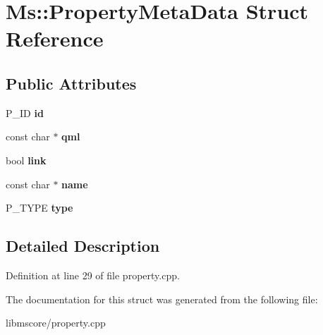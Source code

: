 \hypertarget{struct_ms_1_1_property_meta_data}{}\section{Ms\+:\+:Property\+Meta\+Data Struct Reference}
\label{struct_ms_1_1_property_meta_data}
\subsection*{Public Attributes}
\begin{DoxyCompactItemize}
\item 
\mbox{\label{struct_ms_1_1_property_meta_data_ae0333318f52097d2aa1bec10afcbee08}} 
P\+\_\+\+ID {\bfseries id}
\item 
\mbox{\label{struct_ms_1_1_property_meta_data_a098ac7ad1c5a10782c85d227754301b6}} 
const char $\ast$ {\bfseries qml}
\item 
\mbox{\label{struct_ms_1_1_property_meta_data_aa43a5b7d079e3aee87d1f814a7be4ee0}} 
bool {\bfseries link}
\item 
\mbox{\label{struct_ms_1_1_property_meta_data_a1598c8223dc3a4019fe0ff14f9588631}} 
const char $\ast$ {\bfseries name}
\item 
\mbox{\label{struct_ms_1_1_property_meta_data_adc6887e663e1ea3b8caee293fe9e7764}} 
P\+\_\+\+T\+Y\+PE {\bfseries type}
\end{DoxyCompactItemize}


\subsection{Detailed Description}


Definition at line 29 of file property.\+cpp.



The documentation for this struct was generated from the following file\+:\begin{DoxyCompactItemize}
\item 
libmscore/property.\+cpp\end{DoxyCompactItemize}
